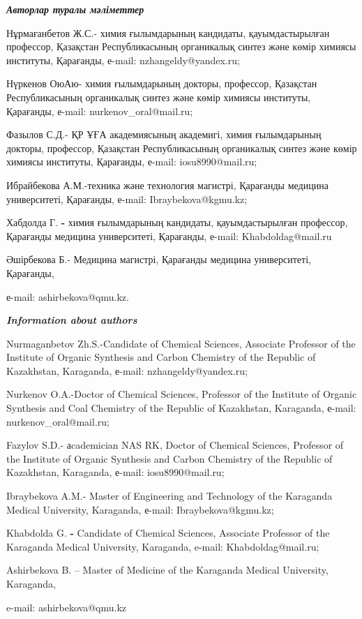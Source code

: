 \emph{{\bfseries Авторлар туралы мәліметтер}}

\begin{noparindent}
Нұрмағанбетов Ж.С.- химия ғылымдарының кандидаты, қауымдастырылған
профессор, Қазақстан Республикасының органикалық синтез және көмір
химиясы институты, Қарағанды, е-mail: nzhangeldy@yandex.ru;

Нүркенов ОюАю- химия ғылымдарының докторы, профессор, Қазақстан
Республикасының органикалық синтез және көмір химиясы институты,
Қарағанды, е-mail: nurkenov\_oral@mail.ru;

Фазылов С.Д.- ҚР ҰҒА академиясының академигі, химия ғылымдарының
докторы, профессор, Қазақстан Республикасының органикалық синтез және
көмір химиясы институты, Қарағанды, е-mail: iosu8990@mail.ru;

Ибрайбекова А.М.-техника және технология магистрі, Қарағанды медицина
университеті, Қарағанды, е-mail: Ibraybekova@kgmu.kz;

Хабдолда Г. {\bfseries -} химия ғылымдарының кандидаты, қауымдастырылған
профессор, Қарағанды медицина университеті, Қарағанды, е-mail:
Khabdoldag@mail.ru

Әшірбекова Б.- Медицина магистрі, Қарағанды медицина университеті,
Қарағанды,

е-mail: ashirbekova@qmu.kz.
\end{noparindent}

\emph{{\bfseries Information about authors}}

\begin{noparindent}
Nurmaganbetov Zh.S.-Candidate of Chemical Sciences, Associate Professor
of the Institute of Organic Synthesis and Carbon Chemistry of the
Republic of Kazakhstan, Karaganda, е-mail: nzhangeldy@yandex.ru;

Nurkenov O.A.-Doctor of Chemical Sciences, Professor of the Institute of
Organic Synthesis and Coal Chemistry of the Republic of Kazakhstan,
Karaganda, е-mail: nurkenov\_oral@mail.ru;

Fazylov S.D.- аcademician NAS RK, Doctor of Chemical Sciences, Professor
of the Institute of Organic Synthesis and Carbon Chemistry of the
Republic of Kazakhstan, Karaganda, е-mail: iosu8990@mail.ru;

Ibraybekova A.M.- Master of Engineering and Technology of the Karaganda
Medical University, Karaganda, е-mail: Ibraybekova@kgmu.kz;

Khabdolda G. {\bfseries -} Candidate of Chemical Sciences, Associate
Professor of the Karaganda Medical University, Karaganda, e-mail:
Khabdoldag@mail.ru;

Ashirbekova B. -- Master of Medicine of the Karaganda Medical
University, Karaganda,

e-mail: ashirbekova@qmu.kz
\end{noparindent}
